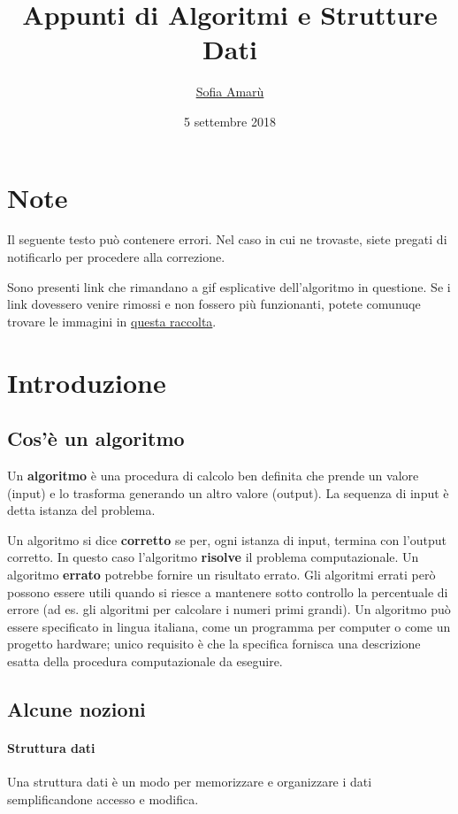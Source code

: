 \documentclass[11pt,a4paper]{article}
\begin{document}
\title{Appunti di Algoritmi e Strutture Dati}
\date{5 settembre 2018}
\author{\href{https://t.me/amarusofia}{Sofia Amarù}}
\maketitle
\tableofcontents

\section*{Note}
Il seguente testo può contenere errori. Nel caso in cui ne trovaste, siete pregati di notificarlo per procedere alla correzione.

Sono presenti link che rimandano a gif esplicative dell'algoritmo in questione. Se i link dovessero venire rimossi e non fossero più funzionanti, potete comunuqe trovare le immagini in \href{https://github.com/amarusofia/Appunti-universitari/tree/master/Algoritmi%20e%20Strutture%20Dati/tex/img/gif}{questa raccolta}.

\section{Introduzione}
\subsection{Cos'è un algoritmo}
Un \textbf{algoritmo} è una procedura di calcolo ben definita che prende un valore (input) e lo trasforma generando un altro valore (output).
La sequenza di input è detta istanza del problema.

Un algoritmo si dice \textbf{corretto} se per, ogni istanza di input, termina con l’output corretto. In questo caso l’algoritmo \textbf{risolve} il problema computazionale.
Un algoritmo \textbf{errato} potrebbe fornire un risultato errato. Gli algoritmi errati però possono essere utili quando si riesce a mantenere sotto controllo la percentuale di errore (ad es. gli algoritmi per calcolare i numeri primi grandi).
Un algoritmo può essere specificato in lingua italiana, come un programma per computer o come un progetto hardware; unico requisito è che la specifica fornisca una descrizione esatta della procedura computazionale da eseguire.

\subsection{Alcune nozioni}
\paragraph{Struttura dati} Una struttura dati è un modo per memorizzare e organizzare i dati semplificandone accesso e modifica.
\end{document}

